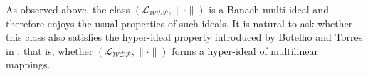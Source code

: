 \documentclass[12 pt]{article}%
\newtheorem{final remark}[theorem]{Final Remark}
\begin{document}
%
%
%

As observed above, the class $(\mathcal{L_{WDP}}, \|\cdot\|)$ is a Banach multi-ideal and therefore enjoys the usual properties of such ideals. It is natural to ask whether this class also satisfies the hyper-ideal property introduced by Botelho and Torres in \cite{BT15}, that is, whether $(\mathcal{L_{WDP}}, \|\cdot\|)$ forms a hyper-ideal of multilinear mappings.
\end{document}
